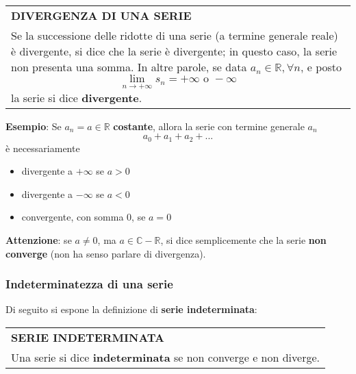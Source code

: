 \documentclass[a4paper]{extarticle}
\renewcommand\arraystretch{}
\begin{document}
\vspace{1em}
\setlength{\tabcolsep}{14pt}
\renewcommand{\arraystretch}{2}
\noindent
\begin{tabularx}{\textwidth}{@{}|P|@{}}
    \hline
    {\textbf{DIVERGENZA DI UNA SERIE}}\\
    \parbox{\linewidth}{Se la successione delle ridotte di una serie (a termine generale reale) è divergente, si dice che la serie è divergente; in questo caso, la serie non presenta una somma.\\
    In altre parole, se data $a_n \in \mathbb{R}, \forall n$, e posto
    \[\lim_{n \to +\infty} s_n = +\infty \text{ o } - \infty\]
    la serie si dice \textbf{divergente}.\vspace{3mm}}\\
    \hline
\end{tabularx}

\vspace{2em}
\noindent
\textbf{Esempio}: Se $a_n = a \in \mathbb{R}$ \textbf{costante}, allora la serie con termine generale $a_n$
\[a_0+a_1+a_2+...\]
è necessariamente 
\begin{itemize}
    \item divergente a $+\infty$ se $a > 0$
    \item divergente a $-\infty$ se $a < 0$
    \item convergente, con somma $0$, se $a = 0$
\end{itemize}
\textbf{Attenzione}: se $a \neq 0$, ma $a \in \mathbb{C} - \mathbb{R}$, si dice semplicemente che la serie \textbf{non converge} (non ha senso parlare di divergenza).


\vspace{1em}
\noindent
\subsubsection{Indeterminatezza di una serie}
Di seguito si espone la definizione di \textbf{serie indeterminata}:

\vspace{1em}
\setlength{\tabcolsep}{14pt}
\renewcommand{\arraystretch}{2}
\noindent
\begin{tabularx}{\textwidth}{@{}|P|@{}}
    \hline
    {\textbf{SERIE INDETERMINATA}}\\
    \parbox{\linewidth}{Una serie si dice \textbf{indeterminata} se non converge e non diverge.\vspace{3mm}}\\
    \hline
\end{tabularx}
\end{document}
